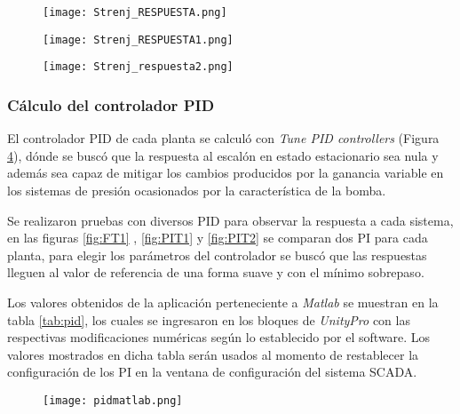 {\begin{comment}
 dónde el motor no era esforzado a calentarse ni la bomba era sobreexigida

escalones ubicados en la parte central del rango útil estipulado .

 además obtener un control apropiado al sistema: algo no muy rapido ni muy lento
\end{comment}


\begin{figure}[h!]
	\centering
	\texttt{[image: Strenj\_RESPUESTA.png]}
	\label{fig:FT01}
\end{figure}
\begin{figure}[h!]
	\centering
	\texttt{[image: Strenj\_RESPUESTA1.png]}
	\label{fig:PIT01}
\end{figure}




\begin{figure}[h!]
	\centering
	\texttt{[image: Strenj\_respuesta2.png]}
	\label{fig:PIT02}
\end{figure}





\clearpage
\subsubsection{Cálculo del controlador PID}
El controlador PID de cada planta se calculó con \textit{Tune PID controllers} (Figura \ref{fig:PIDcontr}), dónde se buscó que la respuesta al escalón en estado estacionario sea nula y además sea capaz de mitigar los cambios producidos por la ganancia variable en los sistemas de presión ocasionados por la característica de la bomba. 

Se realizaron pruebas con diversos PID para observar la respuesta a cada sistema, en las figuras \ref{fig:FT1} , \ref{fig:PIT1} y \ref{fig:PIT2} se comparan dos PI para cada planta, para elegir los parámetros del controlador se buscó que las respuestas lleguen al valor de referencia de una forma suave y con el mínimo sobrepaso.

Los valores obtenidos de la aplicación perteneciente a \textit{Matlab} se muestran en la tabla \ref{tab:pid}, los cuales se ingresaron en los bloques de \textit{UnityPro} con las respectivas modificaciones numéricas según lo establecido por el software. Los valores mostrados en dicha tabla serán usados al momento de restablecer la configuración de los PI en la ventana de configuración del sistema SCADA.
\begin{figure}[h!]
	\centering
	\texttt{[image: pidmatlab.png]}
	\label{fig:PIDcontr}
\end{figure}



}
